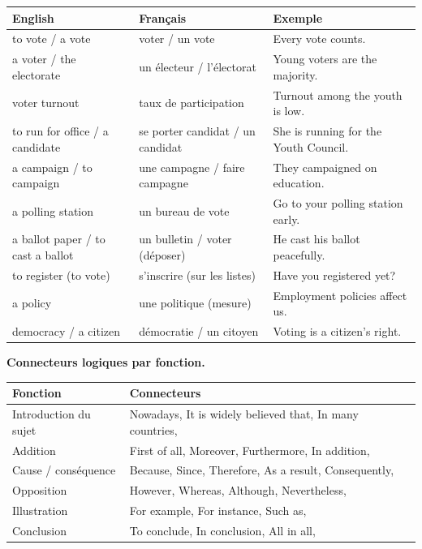 \documentclass[11pt]{article}
\begin{document}
\begin{center}
\begin{tabularx}{\linewidth}{|X|X|X|}\hline
\rowcolor{popblueL} English & Français & Exemple \\ \hline
to vote / a vote & voter / un vote & Every vote counts. \\ \hline
a voter / the electorate & un électeur / l'électorat & Young voters are the majority. \\ \hline
voter turnout & taux de participation & Turnout among the youth is low. \\ \hline
to run for office / a candidate & se porter candidat / un candidat & She is running for the Youth Council. \\ \hline
a campaign / to campaign & une campagne / faire campagne & They campaigned on education. \\ \hline
a polling station & un bureau de vote & Go to your polling station early. \\ \hline
a ballot paper / to cast a ballot & un bulletin / voter (déposer) & He cast his ballot peacefully. \\ \hline
to register (to vote) & s'inscrire (sur les listes) & Have you registered yet? \\ \hline
a policy & une politique (mesure) & Employment policies affect us. \\ \hline
democracy / a citizen & démocratie / un citoyen & Voting is a citizen's right. \\ \hline
\end{tabularx}
\end{center}

\textbf{Connecteurs logiques par fonction.}

\begin{center}
\begin{tabularx}{\linewidth}{|X|X|}\hline
\rowcolor{popblueL} Fonction & Connecteurs \\ \hline
Introduction du sujet & Nowadays, It is widely believed that, In many countries, \\ \hline
Addition & First of all, Moreover, Furthermore, In addition, \\ \hline
Cause / conséquence & Because, Since, Therefore, As a result, Consequently, \\ \hline
Opposition & However, Whereas, Although, Nevertheless, \\ \hline
Illustration & For example, For instance, Such as, \\ \hline
Conclusion & To conclude, In conclusion, All in all, \\ \hline
\end{tabularx}
\end{center}
\end{document}
